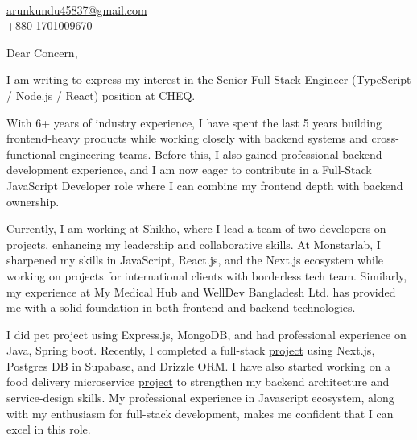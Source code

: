 \documentclass[11pt,a4paper]{article}
\begin{document}
\\[6pt]
\href{mailto:arunkundu45837@gmail.com}{arunkundu45837@gmail.com}\\[4pt]
+880-1701009670

\vspace{24pt}

\noindent Dear Concern,

\vspace{10pt}

\noindent I am writing to express my interest in the Senior Full-Stack Engineer (TypeScript / Node.js / React) position at CHEQ.

\vspace{10pt}

\noindent With 6+ years of industry experience, I have spent the last 5 years building frontend-heavy products while working closely with backend systems and cross-functional engineering teams. Before this, I also gained professional backend development experience, and I am now eager to contribute in a Full-Stack JavaScript Developer role where I can combine my frontend depth with backend ownership.


\vspace{10pt}

\noindent Currently, I am working at Shikho, where I lead a team of two developers on projects, enhancing my leadership and collaborative skills. At Monstarlab, I sharpened my skills in JavaScript, React.js, and the Next.js ecosystem while working on projects for international clients with borderless tech team. Similarly, my experience at My Medical Hub and WellDev Bangladesh Ltd. has provided me with a solid foundation in both frontend and backend technologies.

\vspace{10pt}

\noindent I did pet project using Express.js, MongoDB, and had professional experience on Java, Spring boot. Recently, I completed a full-stack \href{https://github.com/aruncse45/clockit-clone}{project} using Next.js, Postgres DB in Supabase, and Drizzle ORM. I have also started working on a food delivery microservice \href{https://github.com/aruncse45/food-delivery-microservice}{project} to strengthen my backend architecture and service-design skills. My professional experience in Javascript ecosystem, along with my enthusiasm for full-stack development, makes me confident that I can excel in this role.
\end{document}
